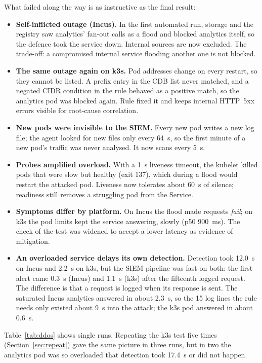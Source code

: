 What failed along the way is as instructive as the final result:
\begin{itemize}
  \item \textbf{Self-inflicted outage (Incus).} In the first automated run, storage and the registry
        saw analytics' fan-out calls as a flood and blocked analytics itself, so the defence took
        the service down. Internal sources are now excluded. The trade-off: a compromised internal
        service flooding another one is not blocked.
  \item \textbf{The same outage again on k3s.} Pod addresses change on every restart, so they
        cannot be listed. A  prefix entry in the CDB list never matched, and a negated
        CIDR condition in the rule behaved as a positive match, so the analytics pod was blocked
        again. Rule  fixed it and keeps internal HTTP~5xx errors visible for root-cause
        correlation.
  \item \textbf{New pods were invisible to the SIEM.} Every new pod writes a new log file; the agent
        looked for new files only every 64~s, so the first minute of a new pod's traffic was never
        analysed. It now scans every 5~s.
  \item \textbf{Probes amplified overload.} With a 1~s liveness timeout, the kubelet killed pods
        that were slow but healthy (exit 137), which during a flood would restart the attacked pod.
        Liveness now tolerates about 60~s of silence; readiness still removes a struggling pod from
        the Service.
  \item \textbf{Symptoms differ by platform.} On Incus the flood made requests \emph{fail}; on k3s
        the pod limits kept the service answering, slowly (p50 900~ms). The check of the test was
        widened to accept a lower latency as evidence of mitigation.
  \item \textbf{An overloaded service delays its own detection.} Detection took 12.0~s on Incus and
        2.2~s on k3s, but the SIEM pipeline was fast on both: the first  alert came
        0.3~s (Incus) and 1.1~s (k3s) after the fifteenth logged request. The difference is that a
        request is logged when its response is sent. The saturated Incus analytics answered in
        about 2.3~s, so the 15 log lines the rule needs only existed about 9~s into the attack; the
        k3s pod answered in about 0.6~s.
\end{itemize}

Table~\ref{tab:ddos} shows single runs. Repeating the k3s test five times
(Section~\ref{sec:repeat}) gave the same picture in three runs, but in two the analytics pod was so
overloaded that detection took 17.4~s or did not happen.

